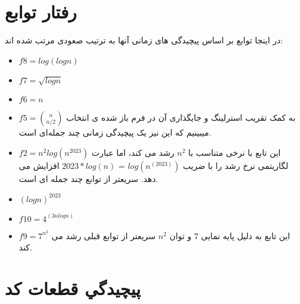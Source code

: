 \documentclass[12pt]{article}
\begin{document}
\fontsize{12pt}{14pt}\selectfont




\section{رفتار توابع}
در اینجا توابع بر اساس پیچیدگی های زمانی آنها به ترتیب صعودی مرتب شده اند:
\begin{itemize}
    \item $f8 = log(logn)$ 
    \item $f7=\sqrt{logn}$
    \item $f6 = n$
    \item $f5 = \binom{n}{n/2}$ به کمک تقریب استرلینگ و جایگذاری آن در فرم باز شده ی انتخاب میبینیم که این نیز یک پیچیدگی زمانی چند جمله‌ای است.
    \item $f2 = n^2 log(n^2023)$ این تابع با نرخی متناسب با $n^2$ رشد می کند، اما عبارت لگاریتمی نرخ رشد را با ضریب $log(n^(2023))$ = $2023*log(n)$ افزایش می دهد. سریعتر از توابع چند جمله ای است.
    \item $(logn)^2023$ 
    \item $f10 = 4^(3nlogn)$ 
    \item $f9 = 7^n^2$ این تابع به دلیل پایه نمایی 7 و توان $n^2$ سریعتر از توابع قبلی رشد می کند.
\end{itemize}



\section{پيچيدگي قطعات كد}
\end{document}
